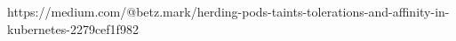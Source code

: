 https://medium.com/@betz.mark/herding-pods-taints-tolerations-and-affinity-in-kubernetes-2279cef1f982